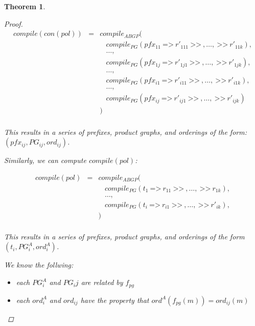 \documentclass[twocolumn]{sig-alternate-10pt}
\newcommand{\Prefer}{\texttt{>>}}
\newcommand{\Path}{\texttt{=>}}
\newtheorem{thm}{Theorem}
\begin{document}
\begin{thm}
\begin{proof}
    \[ \begin{array}{lcl}
        compile(con(pol)) &=& compile_{ABGP}( \\
                          & & ~~~~ compile_{PG}(pfx_{11} ~\Path~ r'_{111} ~\Prefer~,\dots, ~\Prefer~ r'_{11k} ), \\
                          & & ~~~~ \dots, \\
                          & & ~~~~ compile_{PG}(pfx_{1j} ~\Path~ r'_{1j1} ~\Prefer~,\dots, ~\Prefer~ r'_{1jk} ), \\
                          & & ~~~~ \dots, \\
                          & & ~~~~ compile_{PG}(pfx_{i1} ~\Path~ r'_{i11} ~\Prefer~,\dots, ~\Prefer~ r'_{i1k} ), \\
                          & & ~~~~ \dots, \\
                          & & ~~~~ compile_{PG}(pfx_{ij} ~\Path~ r'_{ij1} ~\Prefer~,\dots, ~\Prefer~ r'_{ijk} ) \\
                          & & ) \\
    \end{array} \]
 
    This results in a series of prefixes, product graphs, and orderings of the form: $(pfx_{ij}, PG_{ij}, ord_{ij})$.

    \vspace{1em}
    Similarly, we can compute $compile(pol)$:

    \[ \begin{array}{lcl}
        compile(pol) &=& compile_{ABGP}( \\
                     & & ~~~~ compile_{PG}(t_1 ~\Path~ r_{11} ~\Prefer~,\dots, ~\Prefer~ r_{1k} ), \\
                     & & ~~~~ \dots, \\
                     & & ~~~~ compile_{PG}(t_i ~\Path~ r_{i1} ~\Prefer~,\dots, ~\Prefer~ r'_{ik} ), \\
                     & & ) \\
    \end{array} \]

    This results in a series of prefixes, product graphs, and orderings of the form $(t_i, PG^A_i, ord^A_i)$.

    We know the follwing:

    \begin{itemize}
      \item each $PG^A_i$ and $PG_ij$ are related by $f_{pg}$
      \item each $ord^A_i$ and $ord_{ij}$ have the property that $ord^A(f_{pg}(m)) = ord_{ij}(m)$
    \end{itemize}
    



\end{proof}
\end{thm}
\end{document}
